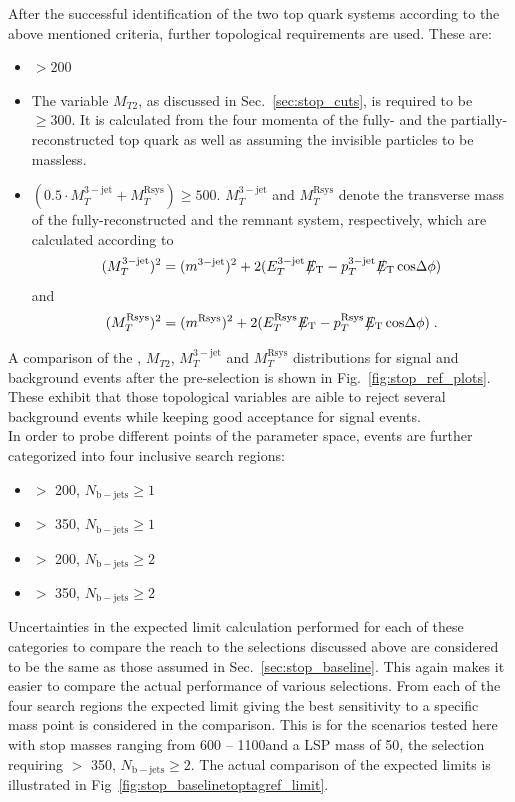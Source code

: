 After the successful identification of the two top quark systems according to the above mentioned criteria, further topological requirements are used. These are:
\begin{itemize}
 \item \met $> 200$\gev
 \item The variable $M_{T2}$, as discussed in Sec.~\ref{sec:stop_cuts}, is required to be $\ge 300$\gev. It is calculated from the four momenta of the fully- and the partially-reconstructed top quark as well as \met assuming the invisible particles to be massless. 
 \item $(0.5 \cdot M_{T}^\mathrm{3-jet} + M_{T}^\mathrm{Rsys}) \ge 500$\gev. $ M_{T}^\mathrm{3-jet}$ and $M_{T}^\mathrm{Rsys}$ denote the transverse mass of the fully-reconstructed and the remnant system, respectively, which are calculated according to
\begin{equation*}
( M_{T}^\mathrm{3-jet})^2 = (m^{3-\mathrm{jet}})^2 + 2(E_T^\mathrm{3-jet} \, \slash\mkern-12mu{E}_{\text{T}} - p_T^\mathrm{3-jet} \, \slash\mkern-12mu{E}_{\text{T}} \, \mathrm{cos} \Delta \phi)
\end{equation*} 
and 
\begin{equation*}
( M_{T}^\mathrm{Rsys})^2 = (m^\mathrm{Rsys})^2 + 2(E_T^\mathrm{Rsys} \, \slash\mkern-12mu{E}_{\text{T}} - p_T^\mathrm{Rsys} \, \slash\mkern-12mu{E}_{\text{T}} \, \mathrm{cos} \Delta \phi) \; .
\end{equation*} 
\end{itemize}
A comparison of the \met, $M_{T2}$, $M_{T}^\mathrm{3-jet}$ and $M_{T}^\mathrm{Rsys}$ distributions for signal and background events after the pre-selection is shown in Fig.~\ref{fig:stop_ref_plots}. These exhibit that those topological variables are aible to reject several background events while keeping good acceptance for signal events. \\
In order to probe different points of the parameter space, events are further categorized into four inclusive search regions:
\begin{itemize}
 \item \met $>$ 200\gev, $N_\mathrm{b-jets} \ge 1$ 
 \item \met $>$ 350\gev, $N_\mathrm{b-jets} \ge 1$ 
 \item \met $>$ 200\gev, $N_\mathrm{b-jets} \ge 2$ 
 \item \met $>$ 350\gev, $N_\mathrm{b-jets} \ge 2$ 
\end{itemize}   
Uncertainties in the expected limit calculation performed for each of these categories to compare the reach to the selections discussed above are considered to be the same as those assumed in Sec.~\ref{sec:stop_baseline}. This again makes it easier to compare the actual performance of various selections. From each of the four search regions the expected limit giving the best sensitivity to a specific mass point is considered in the comparison. This is for the scenarios tested here with stop masses ranging from 600 -- 1100\gev and a LSP mass of 50\gev, the selection requiring \met $>$ 350\gev, $N_\mathrm{b-jets} \ge 2$. The actual comparison of the expected limits is illustrated in Fig~\ref{fig:stop_baselinetoptagref_limit}. \\
